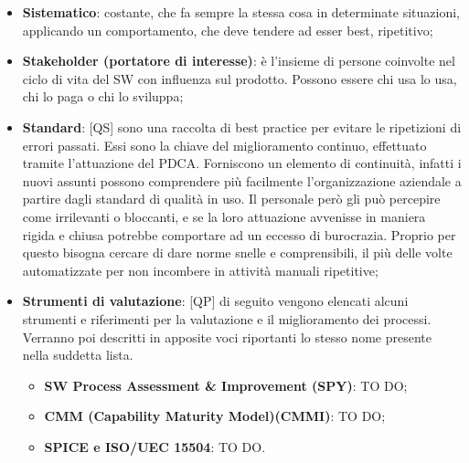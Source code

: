 \begin{itemize}
	\item \textbf{Sistematico}: costante, che fa sempre la stessa cosa in determinate situazioni, applicando un comportamento, che deve tendere ad esser best, ripetitivo;
	\item \textbf{Stakeholder (portatore di interesse)}: è l'insieme di persone coinvolte nel ciclo di vita del SW con influenza sul prodotto. \newline
	Possono essere chi usa lo usa, chi lo paga o chi lo sviluppa;
	\item \textbf{Standard}: [QS] sono una raccolta di best practice per evitare le ripetizioni di errori passati. Essi sono la chiave del miglioramento continuo, effettuato tramite l'attuazione del PDCA. \newline
	Forniscono un elemento di continuità, infatti i nuovi assunti possono comprendere più facilmente l'organizzazione aziendale a partire dagli standard di qualità in uso. \newline
	Il personale però gli può percepire come irrilevanti o bloccanti, e se la loro attuazione avvenisse in maniera rigida e chiusa potrebbe comportare ad un eccesso di burocrazia. Proprio per questo bisogna cercare di dare norme snelle e comprensibili, il più delle volte automatizzate per non incombere in attività manuali ripetitive;
	\item \textbf{Strumenti di valutazione}: [QP] di seguito vengono elencati alcuni strumenti e riferimenti per la valutazione e il miglioramento dei processi. Verranno poi descritti in apposite voci riportanti lo stesso nome presente nella suddetta lista.
		\begin{itemize}
			\item \textbf{SW Process Assessment & Improvement (SPY)}: TO DO;
			\item \textbf{CMM (Capability Maturity Model)(CMMI)}: TO DO;
			\item \textbf{SPICE e ISO/UEC 15504}: TO DO.
		\end{itemize}
\end{itemize}